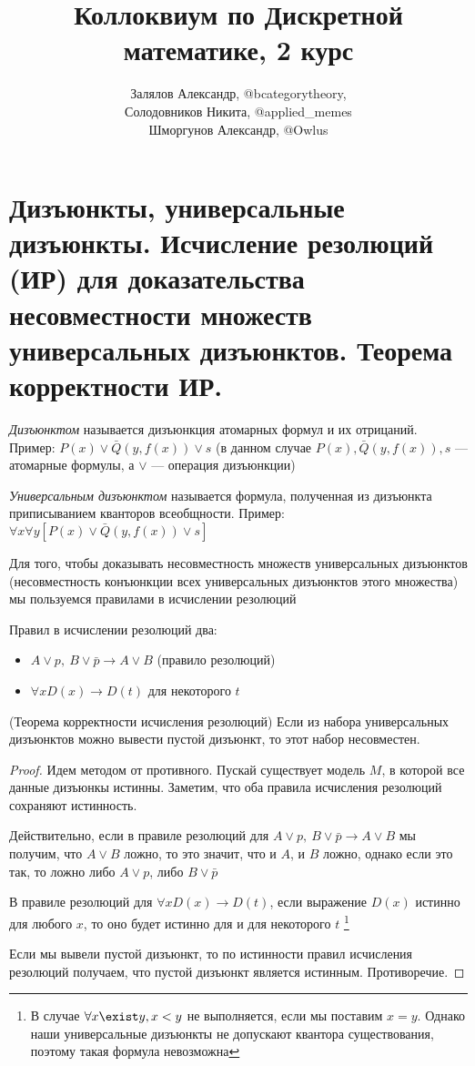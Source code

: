 \documentclass{article}
\title{Коллоквиум по Дискретной математике, 2 курс}
\author{Залялов Александр, @bcategorytheory,\\  Солодовников Никита, @applied\_memes \\ Шморгунов Александр, @Owlus }
\date{}
\begin{document}
\maketitle

\setcounter{section}{19}
\section{Дизъюнкты, универсальные дизъюнкты. Исчисление резолюций (ИР) для доказательства несовместности множеств универсальных дизъюнктов. Теорема корректности ИР.}
\begin{definition}
	\textit{Дизъюнктом} называется дизъюнкция атомарных формул и их отрицаний.\\ 
	Пример: $P(x) \vee \bar Q(y, f(x)) \vee s$ (в данном случае $P(x), \bar Q(y, f(x)), s$ --- атомарные формулы, а $\vee$ --- операция дизъюнкции)
\end{definition}
\begin{definition}
	\textit{Универсальным дизъюнктом} называется формула, полученная из дизъюнкта приписыванием кванторов всеобщности. Пример: $\forall x\forall y [P(x) \vee \bar Q(y, f(x)) \vee s]$
\end{definition}
Для того, чтобы доказывать несовместность множеств универсальных дизъюнктов (несовместность конъюнкции всех универсальных дизъюнктов этого множества) мы пользуемся правилами в исчислении резолюций
\vspace{2mm}

Правил в исчислении резолюций два:
\begin{itemize}
	\item $A \vee p,\ B \vee \bar p \rightarrow A \vee B$ (правило резолюций)
	\item $\forall x D(x) \rightarrow D(t)$ для некоторого $t$ 
\end{itemize}

\begin{theorem}{(Теорема корректности исчисления резолюций)}
	Если из набора универсальных дизъюнктов можно вывести пустой дизъюнкт, то этот набор несовместен.
\end{theorem}
\begin{proof}
	Идем методом от противного. Пускай существует модель $M$, в которой все данные дизъюнкы истинны.
	Заметим, что оба правила исчисления резолюций сохраняют истинность.
	
	Действительно, если в правиле резолюций для $A \vee p,\ B \vee \bar p \rightarrow A \vee B$ мы получим, что $A \vee B$ ложно, то это значит, что и $A$, и $B$ ложно, однако если это так, то ложно либо $A \vee p$, либо $B \vee \bar p$
	
	В правиле резолюций для $\forall x D(x) \rightarrow D(t)$, если выражение $D(x)$ истинно для любого $x$, то оно будет истинно для и для некоторого $t$ \footnote{В случае $\forall x \exist y, x < y$ не выполняется, если мы поставим $x = y$. Однако наши универсальные дизъюнкты не допускают квантора существования, поэтому такая формула невозможна}
	
	Если мы вывели пустой дизъюнкт, то по истинности правил исчисления резолюций получаем, что пустой дизъюнкт является истинным. Противоречие.
\end{proof}
\end{document}
